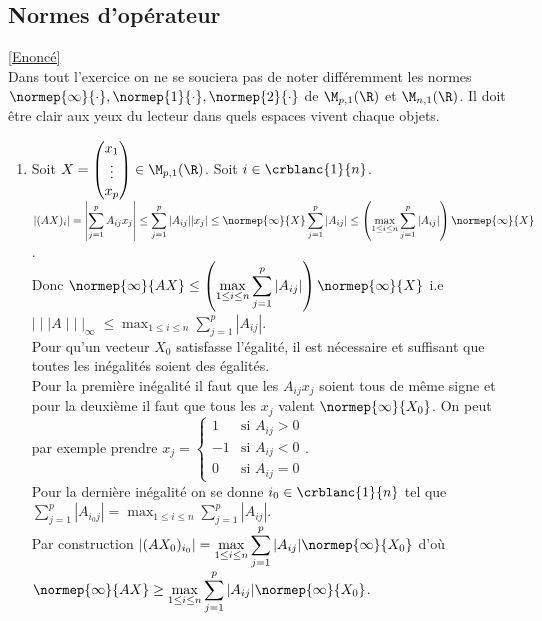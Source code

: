 \documentclass{book}
\begin{document}
	\subsection{Normes d'opérateur }
	\label{sec:normes-doperateur}
	\textcolor{blue}{\hyperref[Normes d'opérateur]{[Enoncé]}}\\
	Dans tout l'exercice on ne se souciera pas de noter différemment les normes $\normep{\infty}{\cdot},\normep{1}{\cdot},\normep{2}{\cdot}$ de $\M_{p,1}(\R)$ et $\M_{n,1}(\R)$. Il doit être clair aux yeux du lecteur dans quels espaces vivent chaque objets.
	\begin{enumerate}
		\item Soit $X=\begin{pmatrix}x_1\\\vdots\\x_p\end{pmatrix}\in \M_{p,1}(\R)$. Soit $i\in \crblanc{1}{n}$.\\
		$|(AX)_i|=\displaystyle\left|\sum_{j=1}^pA_{ij}x_j\right|\leq \sum_{j=1}^p|A_{ij}||x_j|\leq \normep{\infty}{X}\sum_{j=1}^p|A_{ij}|\leq \left(\max_{1\leq i\leq n}\sum_{j=1}^p|A_{ij}|\right)\normep{\infty}{X}$.\\
		Donc $\normep{\infty}{AX}\leq \displaystyle\left(\max_{1\leq i\leq n}\sum_{j=1}^p|A_{ij}|\right)\normep{\infty}{X}$ i.e $\mid\mid\mid A\mid\mid\mid_\infty\leq \displaystyle\max_{1\leq i\leq n}\sum_{j=1}^p|A_{ij}|$.\\
		Pour qu'un vecteur $X_0$ satisfasse l'égalité, il est nécessaire et suffisant que toutes les inégalités soient des égalités.\\
		Pour la première inégalité il faut que les $A_{ij}x_j$ soient tous de même signe et pour la deuxième il faut que tous les $x_j$ valent $\normep{\infty}{X_0}$. On peut par exemple prendre $x_j=\begin{cases}
			1&\mbox{si }A_{ij}>0\\
			-1&\mbox{si }A_{ij}<0\\
			0&\mbox{si }A_{ij}=0
		\end{cases}$.\\
		Pour la dernière inégalité on se donne $i_0\in \crblanc{1}{n}$ tel que $\displaystyle\sum_{j=1}^p|A_{i_0j}|=\max_{1\leq i\leq n}\sum_{j=1}^p|A_{ij}|$.\\
		Par construction $|(AX_0)_{i_0}|=\displaystyle\max_{1\leq i\leq n}\sum_{j=1}^p|A_{ij}|\normep{\infty}{X_0}$ d'où $\normep{\infty}{AX}\geq \displaystyle\max_{1\leq i\leq n}\sum_{j=1}^p|A_{ij}|\normep{\infty}{X_0}$.\\

\end{enumerate}
\end{document}
